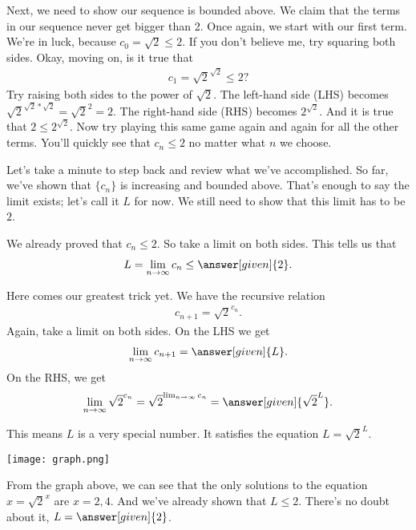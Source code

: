 \documentclass{ximera}
\begin{document}
\begin{exercise}
\begin{exercise}
		\begin{exercise}
			Next, we need to show our sequence is bounded above. We claim that the terms in our sequence never get bigger than 2. Once again, we start with our first term. We're in luck, because $c_0=\sqrt{2} \leq 2$. If you don't believe me, try squaring both sides. Okay, moving on, is it true that
			\begin{align*}
			c_{1}=\sqrt{2}^{\sqrt{2}} \leq 2?
			\end{align*}
			Try raising both sides to the power of $\sqrt{2}$. The left-hand side (LHS) becomes $\sqrt{2}^{\sqrt{2}*\sqrt{2}} = \sqrt{2}^2=2$. The right-hand side (RHS) becomes $2^{\sqrt{2}}$. And it is true that $2\leq 2^{\sqrt{2}}$. Now try playing this same game again and again for all the other terms. You'll quickly see that $c_n \leq 2$ no matter what $n$ we choose.
		\end{exercise}
		
		\begin{exercise}
			Let's take a minute to step back and review what we've accomplished. So far, we've shown that $\{c_n\}$ is increasing and bounded above. That's enough to say the limit exists; let's call it $L$ for now. We still need to show that this limit has to be $2$.
			
			We already proved that $c_{n} \leq 2$. So take a limit on both sides. This tells us that
			\begin{align*}
			L = \lim_{n \to \infty} c_n \leq \answer[given]{2}.
			\end{align*}
			
			Here comes our greatest trick yet. We have the recursive relation
			\begin{align*}
			c_{n+1} = \sqrt{2}^{c_n}.
			\end{align*}
			Again, take a limit on both sides. On the LHS we get
			\begin{align*}
			\lim_{n \to \infty} c_{n+1} = \answer[given]{L}.
			\end{align*}
			On the RHS, we get
			\begin{align*}
			\lim_{n \to \infty} \sqrt{2}^{c_n} = \sqrt{2}^{ \lim_{n \to \infty} c_n} = \answer[given]{\sqrt{2}^L}.
			\end{align*}
			
			\begin{exercise}
				This means $L$ is a very special number. It satisfies the equation $L=\sqrt{2}^L$.
				
				\begin{image}
					\texttt{[image: graph.png]}
				\end{image}
				
				From the graph above, we can see that the only solutions to the equation $x=\sqrt{2}^x$ are $x=2,4$. And we've already shown that $L \leq 2$. There's no doubt about it, $L=\answer[given]{2}$.
			\end{exercise}
		\end{exercise}
	\end{exercise}
\end{exercise}
\end{document}
